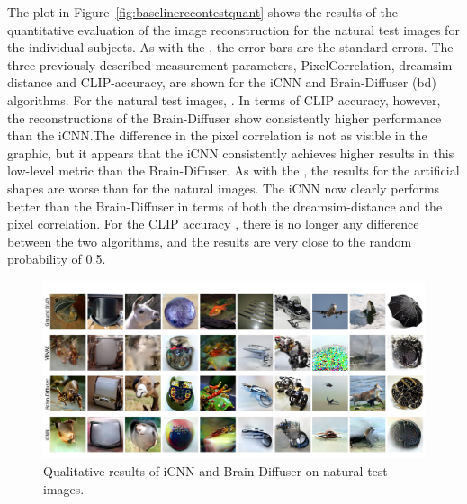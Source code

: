 The plot in Figure~\ref{fig:baselinerecontestquant} shows the results of the quantitative evaluation of the image reconstruction for the natural test images for the individual subjects. As with the , the error bars are the standard errors. The three previously described measurement parameters, PixelCorrelation, dreamsim-distance and CLIP-accuracy, are shown for the iCNN and Brain-Diffuser (bd) algorithms. For the natural test images, . In terms of CLIP accuracy, however, the reconstructions of the Brain-Diffuser show consistently higher performance than the iCNN.\@ The difference in the pixel correlation is not as visible in the graphic, but it appears that the iCNN consistently achieves higher results in this low-level metric than the Brain-Diffuser.  As with the , the results for the artificial shapes are  worse than for the natural images. The iCNN now clearly performs better than the Brain-Diffuser in terms of both the dreamsim-distance and the pixel correlation. For the CLIP accuracy , there is no longer any  difference between the two algorithms, and the results are very close to the random probability of 0.5. 


\begin{figure}[ht]
    \centering
    \includegraphics[width=1\textwidth]{plots/baseline_qual_recon_test.JPEG}
    \caption[Reconstructed images for iCNN and Brain-Diffuser on natural test images]{Qualitative results of iCNN and Brain-Diffuser on natural test images. }\label{fig:baselinerecontestqual}
\end{figure}

